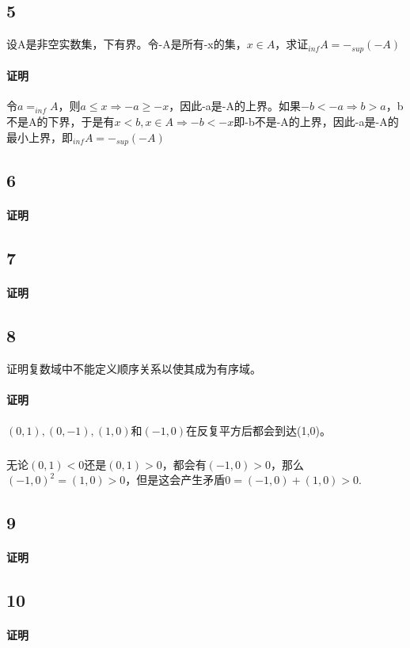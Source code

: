 \subsection*{5} 设A是非空实数集，下有界。令-A是所有-x的集，$x\in A$，求证$_{inf}A=-_{sup}(-A)$
\paragraph{证明} 令$a=_{inf}A$，则$a\le x \Rightarrow -a \ge -x$，因此-a是-A的上界。如果$-b < -a \Rightarrow b > a $，b不是A的下界，于是有$x < b, x\in A \Rightarrow -b < -x $即-b不是-A的上界，因此-a是-A的最小上界，即$_{inf}A=-_{sup}(-A)$
\subsection*{6}
\paragraph{证明}
\subsection*{7}
\paragraph{证明}
\subsection*{8} 证明复数域中不能定义顺序关系以使其成为有序域。
\paragraph{证明}$(0,1),(0, -1),(1, 0)和(-1, 0)$在反复平方后都会到达(1,0)。
\subparagraph{}无论$(0, 1) < 0$还是$(0, 1) > 0$，都会有$(-1, 0) > 0$，那么$(-1, 0)^2=(1, 0) > 0$，但是这会产生矛盾$ 0 = (-1, 0) + (1, 0) > 0$.
\subsection*{9}
\paragraph{证明}
\subsection*{10}
\paragraph{证明}
